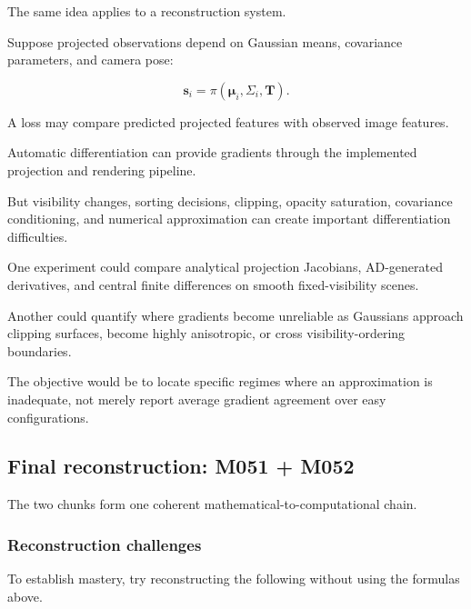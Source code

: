\hypertarget{02-foundations-ii-ch022-connection-to-your-gaussian-reconstruction-work}{}

The same idea applies to a reconstruction system.

Suppose projected observations depend on Gaussian means, covariance parameters, and camera pose:

\[
\mathbf s_i= \pi(\boldsymbol\mu_i,\Sigma_i,\mathbf T).
\]

A loss may compare predicted projected features with observed image features.

Automatic differentiation can provide gradients through the implemented projection and rendering pipeline.

But visibility changes, sorting decisions, clipping, opacity saturation, covariance conditioning, and numerical approximation can create important differentiation difficulties.

One experiment could compare analytical projection Jacobians, AD-generated derivatives, and central finite differences on smooth fixed-visibility scenes.

Another could quantify where gradients become unreliable as Gaussians approach clipping surfaces, become highly anisotropic, or cross visibility-ordering boundaries.

The objective would be to locate specific regimes where an approximation is inadequate, not merely report average gradient agreement over easy configurations.

\subsection{Final reconstruction: M051 + M052}\label{02-foundations-ii-ch022-final-reconstruction-m051-m052}

\hypertarget{02-foundations-ii-ch022-final-reconstruction-m051-m052}{}

The two chunks form one coherent mathematical-to-computational chain.

\subsubsection{Reconstruction challenges}\label{02-foundations-ii-ch022-reconstruction-challenges}

\hypertarget{02-foundations-ii-ch022-reconstruction-challenges}{}

To establish mastery, try reconstructing the following without using the formulas above.

